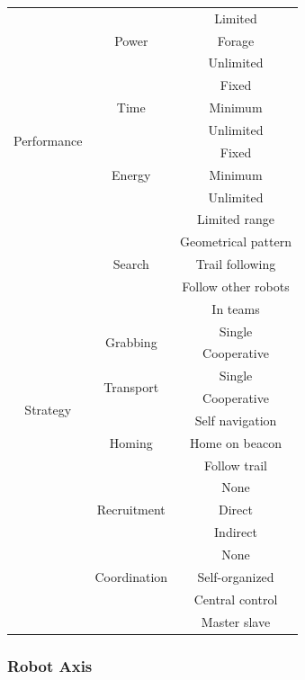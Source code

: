 \begin{longtable}{ | c | c | c |}
		& \multirow{3}{*}{Power} 
			& Limited \\\nopagebreak
		&	& Forage \\\nopagebreak 
		&	& Unlimited \\\hline
	\multirow{6}{*}{Performance}
		& \multirow{3}{*}{Time} 
			& Fixed \\  \nopagebreak
		& 	& Minimum \\ \nopagebreak
		& 	& Unlimited \\ \cline{2-3}
		& \multirow{3}{*}{Energy} 
			& Fixed \\ \nopagebreak
		& 	& Minimum \\ \nopagebreak
		&	& Unlimited \\ \hline
	\multirow{18}{*}{Strategy}	
		& \multirow{5}{*}{Search}
			& Limited range \\ \nopagebreak
		&	& Geometrical pattern\\ \nopagebreak
		&	& Trail following\\ \nopagebreak
		&	& Follow other robots\\ \nopagebreak
		&	& In teams\\ \cline{2-3} \nopagebreak
		& \multirow{2}{*}{Grabbing} 
			& Single \\ \nopagebreak
		&	& Cooperative \\ \cline{2-3} \nopagebreak
		& \multirow{2}{*}{Transport}
			& Single \\ \nopagebreak
		&	& Cooperative \\ \cline{2-3} \nopagebreak
		& \multirow{3}{*}{Homing} 
			& Self navigation \\ \nopagebreak
		&	& Home on beacon \\ \nopagebreak
		&	& Follow trail \\\cline{2-3} \nopagebreak
		& \multirow{3}{*}{Recruitment} 
			& None \\ \nopagebreak
		&	& Direct \\ \nopagebreak
		&	& Indirect \\\cline{2-3} \nopagebreak
		& \multirow{3}{*}{Coordination} 
			& None \\ \nopagebreak
		&	& Self-organized \\ \nopagebreak
		&	&  Central control \\ \nopagebreak
		&	& Master slave \\ \hline
\end{longtable}
\subsubsection{Robot Axis}

